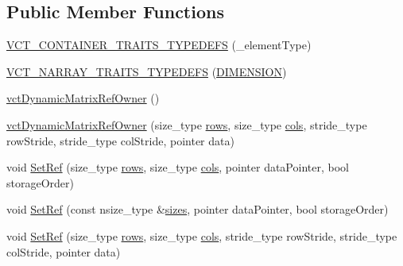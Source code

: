 \subsection*{Public Member Functions}
\begin{DoxyCompactItemize}
\item 
\hyperlink{classvct_dynamic_matrix_ref_owner_a9ae62111eb791881df77724acf6f770a}{V\+C\+T\+\_\+\+C\+O\+N\+T\+A\+I\+N\+E\+R\+\_\+\+T\+R\+A\+I\+T\+S\+\_\+\+T\+Y\+P\+E\+D\+E\+F\+S} (\+\_\+element\+Type)
\item 
\hyperlink{classvct_dynamic_matrix_ref_owner_a43dcc8472acb28d89bb73f464a7b8b99}{V\+C\+T\+\_\+\+N\+A\+R\+R\+A\+Y\+\_\+\+T\+R\+A\+I\+T\+S\+\_\+\+T\+Y\+P\+E\+D\+E\+F\+S} (\hyperlink{classvct_dynamic_matrix_ref_owner_af13d59ea37e2deaafd66ed04d22db916ae19d71a7e9eb96879fbbe0b8acea6fae}{D\+I\+M\+E\+N\+S\+I\+O\+N})
\item 
\hyperlink{classvct_dynamic_matrix_ref_owner_a72f01614f9be39f058c620d408210e41}{vct\+Dynamic\+Matrix\+Ref\+Owner} ()
\item 
\hyperlink{classvct_dynamic_matrix_ref_owner_a8a1de6a902b35030fb153200ae6b22dd}{vct\+Dynamic\+Matrix\+Ref\+Owner} (size\+\_\+type \hyperlink{classvct_dynamic_matrix_ref_owner_a71161877fb7c5ee68659182330398d0c}{rows}, size\+\_\+type \hyperlink{classvct_dynamic_matrix_ref_owner_a99f7f47110e3cfbef58a7274f5a4a9d8}{cols}, stride\+\_\+type row\+Stride, stride\+\_\+type col\+Stride, pointer data)
\item 
void \hyperlink{classvct_dynamic_matrix_ref_owner_adbdbbfeca6dbafd808e4b809658e9e6f}{Set\+Ref} (size\+\_\+type \hyperlink{classvct_dynamic_matrix_ref_owner_a71161877fb7c5ee68659182330398d0c}{rows}, size\+\_\+type \hyperlink{classvct_dynamic_matrix_ref_owner_a99f7f47110e3cfbef58a7274f5a4a9d8}{cols}, pointer data\+Pointer, bool storage\+Order)
\item 
void \hyperlink{classvct_dynamic_matrix_ref_owner_a0843b98e9fa0d75666fd750c0803b27a}{Set\+Ref} (const nsize\+\_\+type \&\hyperlink{classvct_dynamic_matrix_ref_owner_a24eabc5446686143d16cd34d777afe14}{sizes}, pointer data\+Pointer, bool storage\+Order)
\item 
void \hyperlink{classvct_dynamic_matrix_ref_owner_a9ea969a75fe8ff5f44127353b6e49a68}{Set\+Ref} (size\+\_\+type \hyperlink{classvct_dynamic_matrix_ref_owner_a71161877fb7c5ee68659182330398d0c}{rows}, size\+\_\+type \hyperlink{classvct_dynamic_matrix_ref_owner_a99f7f47110e3cfbef58a7274f5a4a9d8}{cols}, stride\+\_\+type row\+Stride, stride\+\_\+type col\+Stride, pointer data)
\item 

\end{DoxyCompactItemize}
